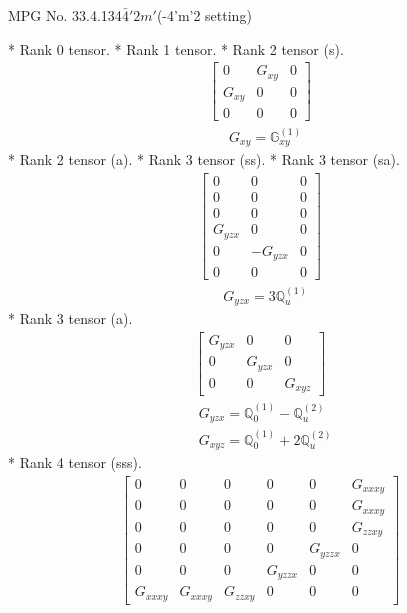 \documentclass[fleqn,8pt,landscape]{jsarticle}
\begin{document}
\setcounter{MaxMatrixCols}{32}

\renewcommand{\tablename}{Table~}
\renewcommand{\figurename}{Figure~}
\begin{center}
\LARGE
MPG No. 33.4.134\quad$\bar{4}'2m'$\quad(-4'm'2 setting)
\end{center}
* Rank 0 tensor.
* Rank 1 tensor.
* Rank 2 tensor (s).
\begin{align*}
\begin{bmatrix} 0 & G_{xy} & 0 \\ G_{xy} & 0 & 0 \\ 0 & 0 & 0 \end{bmatrix}
\end{align*}
\begin{align*}
& G_{xy} = \mathbb{G}_{xy}^{(1)}
\end{align*}
* Rank 2 tensor (a).
* Rank 3 tensor (ss).
* Rank 3 tensor (sa).
\begin{align*}
\begin{bmatrix} 0 & 0 & 0 \\ 0 & 0 & 0 \\ 0 & 0 & 0 \\ G_{yzx} & 0 & 0 \\ 0 & - G_{yzx} & 0 \\ 0 & 0 & 0 \end{bmatrix}
\end{align*}
\begin{align*}
& G_{yzx} = 3 \mathbb{Q}_{u}^{(1)}
\end{align*}
* Rank 3 tensor (a).
\begin{align*}
\begin{bmatrix} G_{yzx} & 0 & 0 \\ 0 & G_{yzx} & 0 \\ 0 & 0 & G_{xyz} \end{bmatrix}
\end{align*}
\begin{align*}
& G_{yzx} = \mathbb{Q}_{0}^{(1)} - \mathbb{Q}_{u}^{(2)} \\
& G_{xyz} = \mathbb{Q}_{0}^{(1)} + 2 \mathbb{Q}_{u}^{(2)}
\end{align*}
* Rank 4 tensor (sss).
\begin{align*}
\begin{bmatrix} 0 & 0 & 0 & 0 & 0 & G_{xxxy} \\ 0 & 0 & 0 & 0 & 0 & G_{xxxy} \\ 0 & 0 & 0 & 0 & 0 & G_{zzxy} \\ 0 & 0 & 0 & 0 & G_{yzzx} & 0 \\ 0 & 0 & 0 & G_{yzzx} & 0 & 0 \\ G_{xxxy} & G_{xxxy} & G_{zzxy} & 0 & 0 & 0 \end{bmatrix}
\end{align*}
\end{document}
